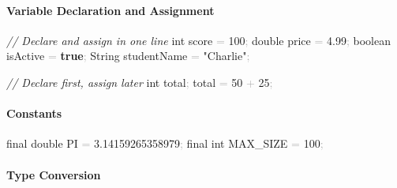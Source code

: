 \documentclass[
  justified,
  openright,
]{tufte-book}
\let\subsection\paragraph
\let\paragraph\paragraph
\newcommand{\KeywordTok}[1]{\textcolor{CodeKeyword}{\textbf{#1}}}  %
\newcommand{\StringTok}[1]{\textcolor{CodeString}{#1}}              %
\newcommand{\CommentTok}[1]{\textcolor{CodeComment}{\textit{#1}}}  %
\newcommand{\CodeNumTok}[1]{\textcolor{CodeNumber}{#1}}             %
\newcommand{\CodeTypeTok}[1]{\textcolor{CodeType}{#1}}              %
\newcommand{\OperatorTok}[1]{\textcolor{DarkGray}{#1}}              %
\newenvironment{Shaded}{%
  \begin{mdframed}[style=TufteCode]%
}{%
  \end{mdframed}%
}
\let\subsection\paragraph
\let\paragraph\paragraph
\begin{document}
\subsection{Variable Declaration and
Assignment}\label{variable-declaration-and-assignment}

\begin{Shaded}
\begin{Highlighting}[]
\CommentTok{// Declare and assign in one line}
\CodeTypeTok{int} score \OperatorTok{=} \CodeNumTok{100}\OperatorTok{;}
\CodeTypeTok{double} price \OperatorTok{=} \CodeNumTok{4.99}\OperatorTok{;}
\CodeTypeTok{boolean} isActive \OperatorTok{=} \KeywordTok{true}\OperatorTok{;}
String studentName \OperatorTok{=} \StringTok{"Charlie"}\OperatorTok{;}
 
\CommentTok{// Declare first, assign later}
\CodeTypeTok{int} total\OperatorTok{;}
total \OperatorTok{=} \CodeNumTok{50} \OperatorTok{+} \CodeNumTok{25}\OperatorTok{;}
\end{Highlighting}
\end{Shaded}

\subsection{Constants}\label{constants-1}

\begin{Shaded}
\begin{Highlighting}[]
\CodeTypeTok{final} \CodeTypeTok{double} PI \OperatorTok{=} \CodeNumTok{3.14159265358979}\OperatorTok{;}
\CodeTypeTok{final} \CodeTypeTok{int} MAX\_SIZE \OperatorTok{=} \CodeNumTok{100}\OperatorTok{;}
\end{Highlighting}
\end{Shaded}

\subsection{Type Conversion}\label{type-conversion-1}
\end{document}

